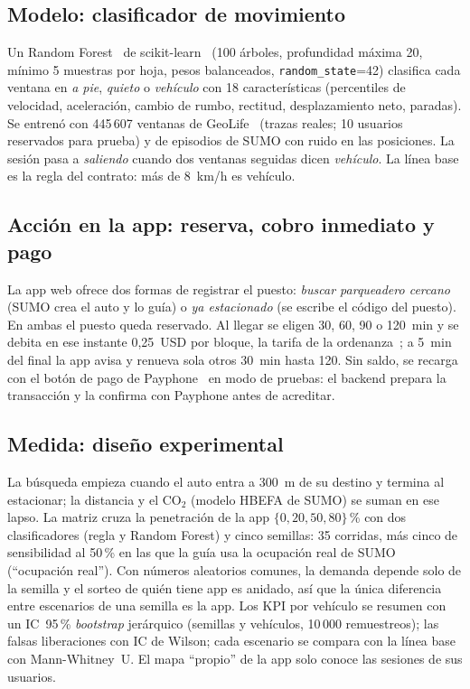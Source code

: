 \documentclass[conference]{IEEEtran}
\newcommand{\cod}[1]{\texttt{#1}}
\begin{document}
\subsection{Modelo: clasificador de movimiento}
Un Random Forest~\cite{breiman2001random} de scikit-learn~\cite{pedregosa2011scikit} (100 árboles, profundidad máxima 20, mínimo 5 muestras por hoja, pesos balanceados, \cod{random\_state}=42) clasifica cada ventana en \emph{a pie}, \emph{quieto} o \emph{vehículo} con 18 características (percentiles de velocidad, aceleración, cambio de rumbo, rectitud, desplazamiento neto, paradas). Se entrenó con 445\,607 ventanas de GeoLife~\cite{zheng2010geolife,zheng2008learning} (trazas reales; 10 usuarios reservados para prueba) y de episodios de SUMO con ruido en las posiciones. La sesión pasa a \emph{saliendo} cuando dos ventanas seguidas dicen \emph{vehículo}. La línea base es la regla del contrato: más de 8~km/h es vehículo.

\subsection{Acción en la app: reserva, cobro inmediato y pago}
La app web ofrece dos formas de registrar el puesto: \emph{buscar parqueadero cercano} (SUMO crea el auto y lo guía) o \emph{ya estacionado} (se escribe el código del puesto). En ambas el puesto queda reservado. Al llegar se eligen 30, 60, 90 o 120~min y se debita en ese instante 0,25~USD por bloque, la tarifa de la ordenanza~\cite{concejo2012sert}; a 5~min del final la app avisa y renueva sola otros 30~min hasta 120. Sin saldo, se recarga con el botón de pago de Payphone~\cite{payphone_api} en modo de pruebas: el backend prepara la transacción y la confirma con Payphone antes de acreditar.

\subsection{Medida: diseño experimental}
La búsqueda empieza cuando el auto entra a 300~m de su destino y termina al estacionar; la distancia y el CO$_2$ (modelo HBEFA de SUMO) se suman en ese lapso. La matriz cruza la penetración de la app $\{0,20,50,80\}$\,\% con dos clasificadores (regla y Random Forest) y cinco semillas: 35 corridas, más cinco de sensibilidad al 50\,\% en las que la guía usa la ocupación real de SUMO (``ocupación real''). Con números aleatorios comunes, la demanda depende solo de la semilla y el sorteo de quién tiene app es anidado, así que la única diferencia entre escenarios de una semilla es la app. Los KPI por vehículo se resumen con un IC~95\,\% \emph{bootstrap} jerárquico (semillas y vehículos, 10\,000 remuestreos); las falsas liberaciones con IC de Wilson; cada escenario se compara con la línea base con Mann-Whitney~U. El mapa ``propio'' de la app solo conoce las sesiones de sus usuarios.
\end{document}
